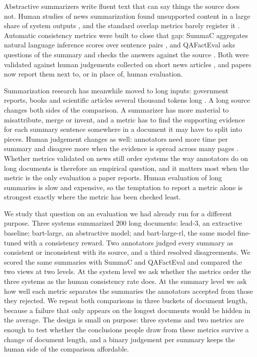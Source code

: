 Abstractive summarizers write fluent text that can say things the source does not. Human studies of news summarization found unsupported content in a large share of system outputs \citep{maynez2020faithfulness}, and the standard overlap metrics barely register it \citep{kryscinski2019critical,goodrich2019factual}. Automatic consistency metrics were built to close that gap: SummaC aggregates natural language inference scores over sentence pairs \citep{laban2022summac}, and QAFactEval asks questions of the summary and checks the answers against the source \citep{fabbri2022qafacteval}. Both were validated against human judgements collected on short news articles \citep{fabbri2021summeval}, and papers now report them next to, or in place of, human evaluation.

Summarization research has meanwhile moved to long inputs: government reports, books and scientific articles several thousand tokens long \citep{huang2021govreport,kryscinski2022booksum}. A long source changes both sides of the comparison. A summarizer has more material to misattribute, merge or invent, and a metric has to find the supporting evidence for each summary sentence somewhere in a document it may have to split into pieces. Human judgement changes as well: annotators need more time per summary and disagree more when the evidence is spread across many pages \citep{krishna2023longeval}. Whether metrics validated on news still order systems the way annotators do on long documents is therefore an empirical question, and it matters most when the metric is the only evaluation a paper reports. Human evaluation of long summaries is slow and expensive, so the temptation to report a metric alone is strongest exactly where the metric has been checked least.

We study that question on an evaluation we had already run for a different purpose. Three systems summarized 200 long documents: lead-3, an extractive baseline; bart-large, an abstractive model; and bart-large-rl, the same model fine-tuned with a consistency reward. Two annotators judged every summary as consistent or inconsistent with its source, and a third resolved disagreements. We scored the same summaries with SummaC and QAFactEval and compared the two views at two levels. At the system level we ask whether the metrics order the three systems as the human consistency rate does. At the summary level we ask how well each metric separates the summaries the annotators accepted from those they rejected. We repeat both comparisons in three buckets of document length, because a failure that only appears on the longest documents would be hidden in the average. The design is small on purpose: three systems and two metrics are enough to test whether the conclusions people draw from these metrics survive a change of document length, and a binary judgement per summary keeps the human side of the comparison affordable.

